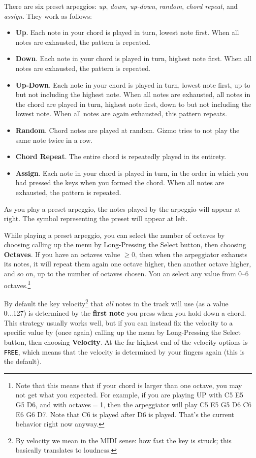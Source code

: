\documentclass{article}
\begin{document}
There are six preset arpeggios: {\it up}, {\it down}, {\it up-down}, {\it random}, {\it chord repeat}, and {\it assign}.  They work as follows:

\begin{itemize}
\item {\bf Up}.  Each note in your chord is played in turn, lowest note first.  When all notes are exhausted, the pattern is repeated.
\item {\bf Down}.  Each note in your chord is played in turn, highest note first.  When all notes are exhausted, the pattern is repeated.
\item {\bf Up-Down}.  Each note in your chord is played in turn, lowest note first, up to but not including the highest note.  When all notes are exhausted, all notes in the chord are played in turn, highest note first, down to but not including the lowest note.  When all notes are again exhausted, this pattern repeats.

\item {\bf Random}.  Chord notes are played at random.  Gizmo tries to not play the same note twice in a row.
\item {\bf Chord Repeat}.  The entire chord is repeatedly played in its entirety.
\item {\bf Assign}. Each note in your chord is played in turn, in the order in which you had pressed the keys when you formed the chord.  When all notes are exhausted, the pattern is repeated.
\end{itemize}

As you play a preset arpeggio, the notes played by the arpeggio will appear at right.  The symbol representing the preset will appear at left.

While playing a preset arpeggio, you can select the number of octaves by choosing calling up the menu by Long-Pressing the Select button, then choosing {\bf Octaves}.  If you have an octaves value \(\geq 0\), then when the arpeggiator exhausts its notes, it will repeat them again one octave higher, then another octave higher, and so on, up to the number of octaves chosen. You an select any value from 0--6 octaves.\footnote{Note that this means that if your chord is larger than one octave, you may not get what you expected.  For example, if you are playing UP with C5 E5 G5 D6, and with octaves\(=\)1, then the arpeggiator will play C5 E5 G5 D6 C6 E6 G6 D7.  Note that C6 is played after D6 is played.  That's the current behavior right now anyway.}

By default the key velocity\footnote{By velocity we mean in the MIDI sense: how fast the key is struck; this basically translates to loudness.} that {\it all} notes in the track will use (as a value 0...127) is determined by the {\bf first note} you press when you hold down a chord.  This strategy usually works well, but if you can instead fix the velocity to a specific value by (once again) calling up the menu by Long-Pressing the Select button, then choosing {\bf Velocity}.  At the far highest end of the velocity options is \texttt{FREE}, which means that the velocity is determined by your fingers again (this is the default).
\end{document}
